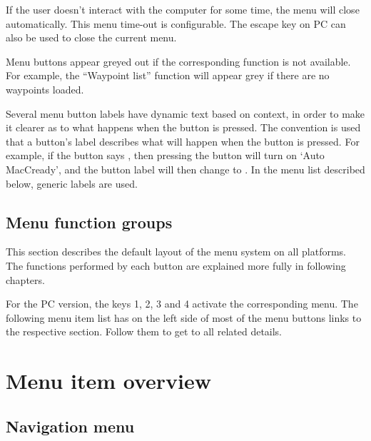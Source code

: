 If the user doesn't interact with the computer for some time, the
menu will close automatically.  This menu time-out is configurable.
The escape key on PC can also be used to close the current menu.

Menu buttons appear greyed out if the corresponding function is not available. 
For example, the ``Waypoint list'' function will appear grey if there are no waypoints loaded.

Several menu button labels have dynamic text based on context, in
order to make it clearer as to what happens when the button is
pressed.  The convention is used that a button's label describes what
will happen when the button is pressed.  For example, if the button
says , then pressing the button will turn on `Auto
MacCready', and the button label will then change to . 
In the menu list described below, generic labels are used.

\subsection*{Menu function groups}
This section describes the default layout of the menu system on all
platforms.  The functions performed by each button are explained more
fully in following chapters.

For the PC version, the keys 1, 2, 3 and 4 activate the 
corresponding menu.  The following menu item list has on the left side of most 
of the menu buttons links to the respective section. Follow them to get to all 
related details.

\section{Menu item overview}

\subsection*{Navigation menu}
\noindent{}

